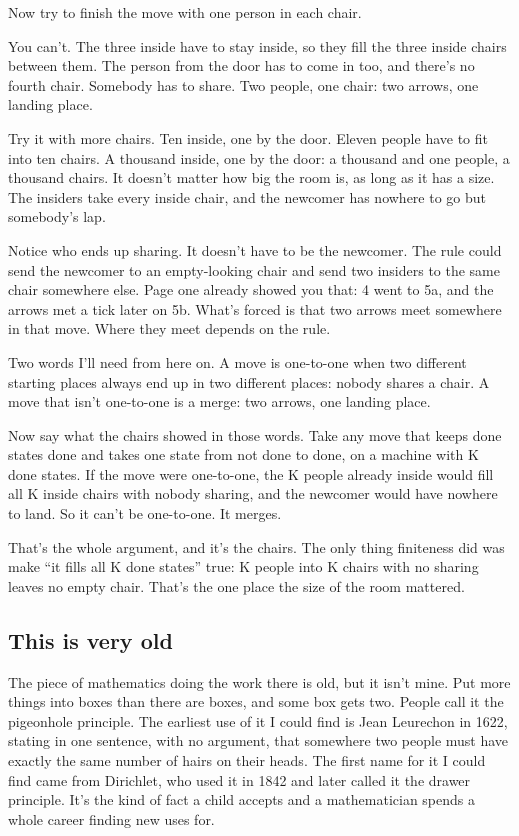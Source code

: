 \documentclass[11pt,twoside]{article}
\theoremstyle{thielethm}
\theoremstyle{thieledef}
\theoremstyle{thieledef}
\theoremstyle{thieledef}
\theoremstyle{thielethm}
\theoremstyle{thieleobs}
\theoremstyle{thielethm}
\begin{document}
Now try to finish the move with one person in each chair.

You can't. The three inside have to stay inside, so they fill the three inside chairs between them. The person from the door has to come in too, and there's no fourth chair. Somebody has to share. Two people, one chair: two arrows, one landing place.

Try it with more chairs. Ten inside, one by the door. Eleven people have to fit into ten chairs. A thousand inside, one by the door: a thousand and one people, a thousand chairs. It doesn't matter how big the room is, as long as it has a size. The insiders take every inside chair, and the newcomer has nowhere to go but somebody's lap.

Notice who ends up sharing. It doesn't have to be the newcomer. The rule could send the newcomer to an empty-looking chair and send two insiders to the same chair somewhere else. Page one already showed you that: 4 went to 5a, and the arrows met a tick later on 5b. What's forced is that two arrows meet somewhere in that move. Where they meet depends on the rule.

Two words I'll need from here on. A move is one-to-one when two different starting places always end up in two different places: nobody shares a chair. A move that isn't one-to-one is a merge: two arrows, one landing place.

Now say what the chairs showed in those words. Take any move that keeps done states done and takes one state from not done to done, on a machine with K done states. If the move were one-to-one, the K people already inside would fill all K inside chairs with nobody sharing, and the newcomer would have nowhere to land. So it can't be one-to-one. It merges.

That's the whole argument, and it's the chairs. The only thing finiteness did was make ``it fills all K done states'' true: K people into K chairs with no sharing leaves no empty chair. That's the one place the size of the room mattered.

\subsection{This is very old}

The piece of mathematics doing the work there is old, but it isn't mine. Put more things into boxes than there are boxes, and some box gets two. People call it the pigeonhole principle. The earliest use of it I could find is Jean Leurechon in 1622, stating in one sentence, with no argument, that somewhere two people must have exactly the same number of hairs on their heads. The first name for it I could find came from Dirichlet, who used it in 1842 and later called it the drawer principle. It's the kind of fact a child accepts and a mathematician spends a whole career finding new uses for.
\end{document}
